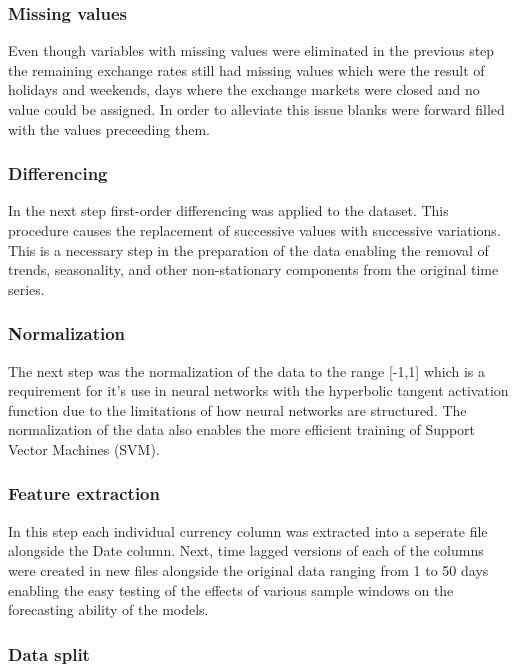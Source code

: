 \subsubsection{Missing values}\label{Missing values}

Even though variables with missing values were eliminated in the previous step the remaining exchange rates still had missing values which were the result of holidays and weekends, days where the exchange markets were closed and no value could be assigned. In order to alleviate this issue blanks were forward filled with the values preceeding them.

\subsubsection{Differencing}\label{Differencing}

In the next step first-order differencing was applied to the dataset. This procedure causes the replacement of successive values with successive variations. This is a necessary step in the preparation of the data enabling the removal of trends, seasonality, and other non-stationary components from the original time series.

\subsubsection{Normalization}\label{Normalization}

The next step was the normalization of the data to the range [-1,1] which is a requirement for it's use in neural networks with the hyperbolic tangent activation function due to the limitations of how neural networks are structured. The normalization of the data also enables the more efficient training of Support Vector Machines (SVM).

\subsubsection{Feature extraction}\label{Feature extraction}

In this step each individual currency column was extracted into a seperate file alongside the Date column. Next, time lagged versions of each of the columns were created in new files alongside the original data ranging from 1 to 50 days enabling the easy testing of the effects of various sample windows on the forecasting ability of the models.

\subsubsection{Data split}\label{Data split}

